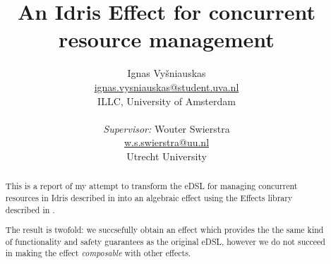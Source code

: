 \documentclass{article}
\title{An Idris Effect for concurrent resource management}
\author{Ignas Vyšniauskas \\ \url{ignas.vysniauskas@student.uva.nl} \\
        ILLC, University of Amsterdam \\
    \\ \textit{Supervisor:} Wouter Swierstra
    \\ \url{w.s.swierstra@uu.nl}
    \\ Utrecht University
}
\begin{document}
\maketitle

\begin{abstract}
    This is a report of my attempt to transform the eDSL for managing
    concurrent resources in Idris described in \cite{cbconc-fi} into an
    algebraic effect using the Effects library described in \cite{effects-idr}.

    The result is twofold: we succsefully obtain an effect which provides the
    the same kind of functionality and safety guarantees as the original eDSL,
    however we do not succeed in making the effect \emph{composable} with
    other effects.
\end{abstract}









\end{document}
